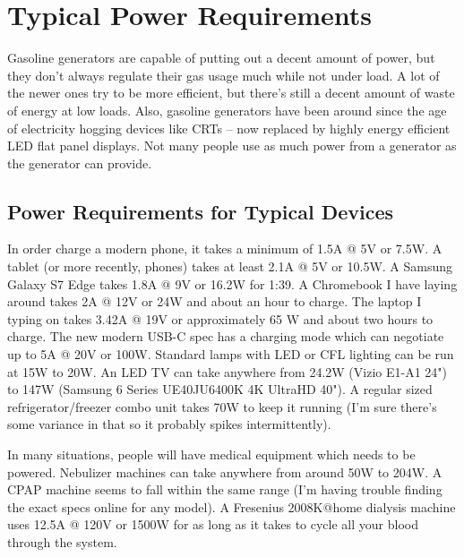 \documentclass[
10pt, %
letterpaper, %
oneside, %
headinclude,footinclude, %
BCOR5mm, %
]{scrartcl}
\begin{document}

\section{Typical Power Requirements}

Gasoline generators are capable of putting out a decent amount of power, but they don't always regulate their gas usage much while not under load. A lot of the newer ones try to be more efficient, but there's still a decent amount of waste of energy at low loads. Also, gasoline generators have been around since the age of electricity hogging devices like CRTs -- now replaced by highly energy efficient LED flat panel displays. Not many people use as much power from a generator as the generator can provide.

\subsection{Power Requirements for Typical Devices}

In order charge a modern phone, it takes a minimum of 1.5A @ 5V or 7.5W. A tablet (or more recently, phones) takes at least 2.1A @ 5V or 10.5W. A Samsung Galaxy S7 Edge takes 1.8A @ 9V or 16.2W for 1:39. A Chromebook I have laying around takes 2A @ 12V or 24W and about an hour to charge. The laptop I typing on takes 3.42A @ 19V or approximately 65 W and about two hours to charge. The new modern USB-C spec has a charging mode which can negotiate up to 5A @ 20V or 100W. Standard lamps with LED or CFL lighting can be run at 15W to 20W. An LED TV can take anywhere from 24.2W (Vizio E1-A1 24") to 147W (Samsung 6 Series UE40JU6400K 4K UltraHD 40"). A regular sized refrigerator/freezer combo unit takes 70W to keep it running (I'm sure there's some variance in that so it probably spikes intermittently).

In many situations, people will have medical equipment which needs to be powered. Nebulizer machines can take anywhere from around 50W to 204W. A CPAP machine seems to fall within the same range (I'm having trouble finding the exact specs online for any model). A Fresenius 2008K@home dialysis machine uses 12.5A @ 120V or 1500W for as long as it takes to cycle all your blood through the system.
\end{document}

